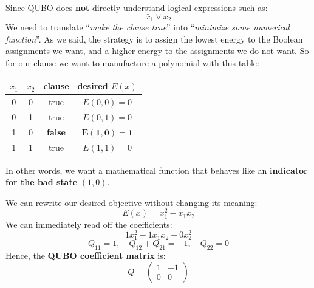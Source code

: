 \begin{deepeningbox}
    \highspace
    Since QUBO does \textbf{not} directly understand logical expressions such as:
    \begin{equation*}
        \bar{x}_1 \vee x_2
    \end{equation*}
    We need to translate ``\emph{make the clause true}'' into ``\emph{minimize some numerical function}''. As we said, the strategy is to assign the lowest energy to the Boolean assignments we want, and a higher energy to the assignments we do not want. So for our clause we want to manufacture a polynomial with this table:
    \begin{center}
        \begin{tabular}{@{} c c c c @{}}
            \toprule
            $x_1$ & $x_2$ & \textbf{clause} & \textbf{desired} $E(x)$ \\
            \midrule
            0 & 0 & true & $E(0,0) = 0$ \\
            0 & 1 & true & $E(0,1) = 0$ \\
            1 & 0 & \textbf{false} & $\mathbf{E(1,0) = 1}$ \\
            1 & 1 & true & $E(1,1) = 0$ \\
            \bottomrule
        \end{tabular}
    \end{center}
    \noindent
    In other words, we want a mathematical function that behaves like an \textbf{indicator for the bad state} $(1,0)$.
\end{deepeningbox}

\highspace
{} We can rewrite our desired objective without changing its meaning:
\begin{equation*}
    E(x) = x_1^2 - x_1 x_2
\end{equation*}
We can immediately read off the coefficients:
\begin{equation*}
    1x_1^2 - 1x_1x_2 + 0x_2^2
\end{equation*}
\begin{equation*}
    Q_{11} = 1, \quad Q_{12}+Q_{21} = -1, \quad Q_{22} = 0
\end{equation*}
Hence, the \textbf{QUBO coefficient matrix} is:
\begin{equation*}
    \boxed{Q =
        \begin{pmatrix}
            1 & -1 \\
            0 & 0
    \end{pmatrix}}
\end{equation*}

